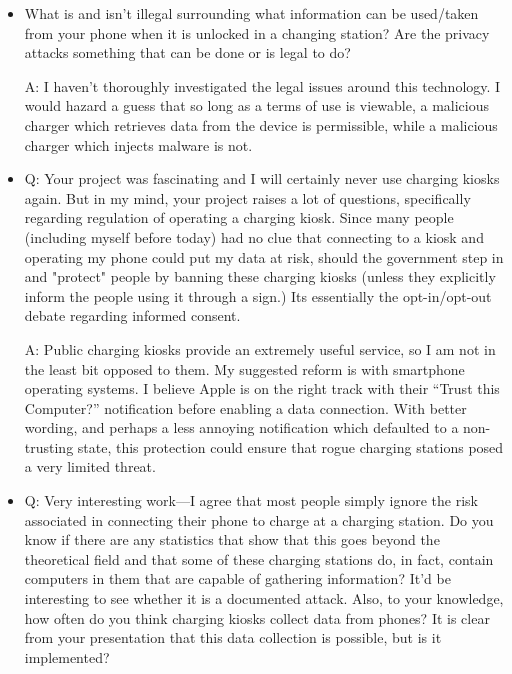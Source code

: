 \documentclass[11pt]{article} %
\begin{document}
\begin{itemize}
A: The threat is significant. If you're able to gain access to the phone in this capacity, the phone's data is presented to you in an unencrypted form. You can immediately take any information from the phone which is designed to by synced between phones and computers -- all media and contacts. Moreover, this attack enables the injection of malware onto the phone, as the data communication is two-way. Such an attack was demonstrated by Geogia Tech in 2013\footnote{Ibid.}. 

\item What is and isn't illegal surrounding what information can be used/taken from your phone when it is unlocked in a changing station? Are the privacy attacks something that can be done or is legal to do?

A: I haven't thoroughly investigated the legal issues around this technology. I would hazard a guess that so long as a terms of use is viewable, a malicious charger which retrieves data from the device is permissible, while a malicious charger which injects malware is not. 

\item Q: Your project was fascinating and I will certainly never use charging kiosks again. But in my mind, your project raises a lot of questions, specifically regarding regulation of operating a charging kiosk. Since many people (including myself before today) had no clue that connecting to a kiosk and operating my phone could put my data at risk, should the government step in and "protect" people by banning these charging kiosks (unless they explicitly inform the people using it through a sign.) Its essentially the opt-in/opt-out debate regarding informed consent.

A: Public charging kiosks provide an extremely useful service, so I am not in the least bit opposed to them. My suggested reform is with smartphone operating systems. I believe Apple is on the right track with their ``Trust this Computer?'' notification before enabling a data connection. With better wording, and perhaps a less annoying notification which defaulted to a non-trusting state, this protection could ensure that rogue charging stations posed a very limited threat. 

\item Q: Very interesting work—I agree that most people simply ignore the risk associated in connecting their phone to charge at a charging station. Do you know if there are any statistics that show that this goes beyond the theoretical field and that some of these charging stations do, in fact, contain computers in them that are capable of gathering information? It'd be interesting to see whether it is a documented attack. Also, to your knowledge, how often do you think charging kiosks collect data from phones? It is clear from your presentation that this data collection is possible, but is it implemented?


\end{itemize}
\end{document}
